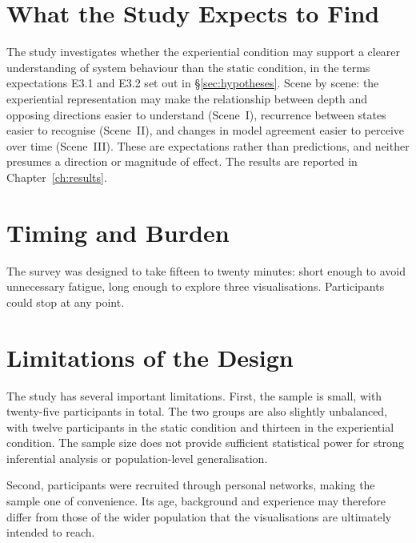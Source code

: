 \section{What the Study Expects to Find}
\label{sec:eval-expectations}

The study investigates whether the experiential condition may support a clearer understanding of system behaviour than the static condition, in the terms expectations E3.1 and E3.2 set out in \S\ref{sec:hypotheses}. Scene by scene: the experiential representation may make the relationship between depth and opposing directions easier to understand (Scene~I), recurrence between states easier to recognise (Scene~II), and changes in model agreement easier to perceive over time (Scene~III). These are expectations rather than predictions, and neither presumes a direction or magnitude of effect. The results are reported in Chapter~\ref{ch:results}.

\section{Timing and Burden}
\label{sec:eval-burden}

The survey was designed to take fifteen to twenty minutes: short enough to avoid unnecessary fatigue, long enough to explore three visualisations. Participants could stop at any point.

\section{Limitations of the Design}
\label{sec:eval-limitations}

The study has several important limitations. First, the sample is small, with twenty-five participants in total. The two groups are also slightly unbalanced, with twelve participants in the static condition and thirteen in the experiential condition. The sample size does not provide sufficient statistical power for strong inferential analysis or population-level generalisation.

Second, participants were recruited through personal networks, making the sample one of convenience. Its age, background and experience may therefore differ from those of the wider population that the visualisations are ultimately intended to reach.

